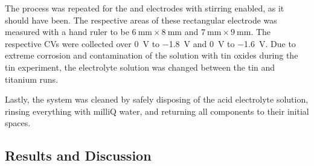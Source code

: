 \documentclass[../labs.tex]{subfiles}
\begin{document}
The process was repeated for the  and  electrodes with stirring enabled, as it should have been. The respective areas of these rectangular electrode was measured with a hand ruler to be $\SI{6}{\milli\meter}\times\SI{8}{\milli\meter}$ and $\SI{7}{\milli\meter}\times\SI{9}{\milli\meter}$. The respective CVs were collected over \SI{0}{\volt} to \SI{-1.8}{\volt} and \SI{0}{\volt} to \SI{-1.6}{\volt}. Due to extreme corrosion and contamination of the solution with tin oxides during the tin experiment, the electrolyte solution was changed between the tin and titanium runs.\par
Lastly, the system was cleaned by safely disposing of the acid electrolyte solution, rinsing everything with milliQ water, and returning all components to their initial spaces.


\subsection*{Results and Discussion}
\end{document}
